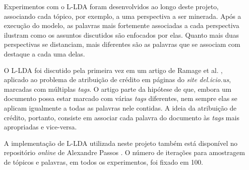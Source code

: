 Experimentos com o L-LDA foram desenvolvidos ao longo deste projeto, associando cada tópico, por exemplo, a uma perspectiva a ser minerada. Após a execução do modelo, as palavras mais fortemente associadas a cada perspectiva ilustram como os assuntos discutidos são enfocados por elas. Quanto mais duas perspectivas se distanciam, mais diferentes são as palavras que se associam com destaque a cada uma delas.

O L-LDA foi discutido pela primeira vez em um artigo de Ramage et al. \cite{llda}, aplicado ao problema de atribuição de crédito em páginas do \emph{site del.icio.us}, marcadas com múltiplas \emph{tags}. O artigo parte da hipótese de que, embora um documento possa estar marcado com várias \emph{tags} diferentes, nem sempre elas se aplicam igualmente a todas as palavras nele contidas. A ideia da atribuição de crédito, portanto, consiste em associar cada palavra do documento às \emph{tags} mais apropriadas e vice-versa. 


A implementação de L-LDA utilizada neste projeto também está disponível no repositório \emph{online} de Alexandre Passos \cite{top-llda}. O número de iterações para amostragem de tópicos e palavras, em todos os experimentos, foi fixado em 100.




